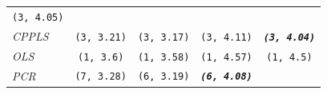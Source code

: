 \documentclass[12pt,A4paper,authoryear]{elsarticle} %
\theoremstyle{definition}
\theoremstyle{definition}
\theoremstyle{remark}
\begin{document}
\begin{longtable}[]{@{}lcccc@{}}
\begin{minipage}[t]{0.19\columnwidth}
\texttt{(3,\ 4.05)}\strut
\end{minipage}\tabularnewline
\begin{minipage}[t]{0.09\columnwidth}\raggedright\strut
\emph{CPPLS}\strut
\end{minipage} & \begin{minipage}[t]{0.19\columnwidth}\centering\strut
\texttt{(3,\ 3.21)}\strut
\end{minipage} & \begin{minipage}[t]{0.19\columnwidth}\centering\strut
\texttt{(3,\ 3.17)}\strut
\end{minipage} & \begin{minipage}[t]{0.19\columnwidth}\centering\strut
\texttt{(3,\ 4.11)}\strut
\end{minipage} & \begin{minipage}[t]{0.19\columnwidth}\centering\strut
\textbf{\emph{\texttt{(3,\ 4.04)}}}\strut
\end{minipage}\tabularnewline
\begin{minipage}[t]{0.09\columnwidth}\raggedright\strut
\emph{OLS}\strut
\end{minipage} & \begin{minipage}[t]{0.19\columnwidth}\centering\strut
\texttt{(1,\ 3.6)}\strut
\end{minipage} & \begin{minipage}[t]{0.19\columnwidth}\centering\strut
\texttt{(1,\ 3.58)}\strut
\end{minipage} & \begin{minipage}[t]{0.19\columnwidth}\centering\strut
\texttt{(1,\ 4.57)}\strut
\end{minipage} & \begin{minipage}[t]{0.19\columnwidth}\centering\strut
\texttt{(1,\ 4.5)}\strut
\end{minipage}\tabularnewline
\begin{minipage}[t]{0.09\columnwidth}\raggedright\strut
\emph{PCR}\strut
\end{minipage} & \begin{minipage}[t]{0.19\columnwidth}\centering\strut
\texttt{(7,\ 3.28)}\strut
\end{minipage} & \begin{minipage}[t]{0.19\columnwidth}\centering\strut
\texttt{(6,\ 3.19)}\strut
\end{minipage} & \begin{minipage}[t]{0.19\columnwidth}\centering\strut
\textbf{\emph{\texttt{(6,\ 4.08)}}}\strut
\end{minipage} & \begin{minipage}[t]{0.19\columnwidth}\centering\strut

\end{minipage}
\end{longtable}
\end{document}
